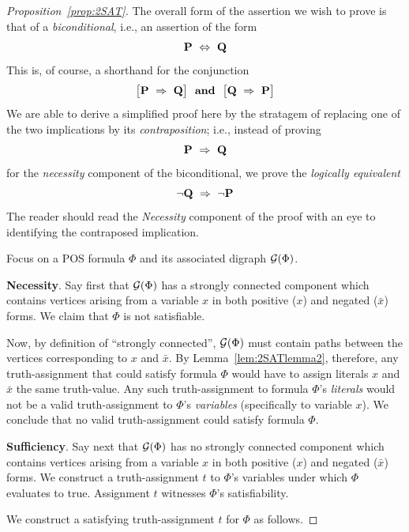 \begin{proof}[Proposition~\ref{prop:2SAT}]
The overall form of the assertion we wish to prove is that of a {\em biconditional},
i.e., an assertion of the form
\[ \mbox{\bf P} \ \Leftrightarrow \ \mbox{\bf Q} \]
This is, of course, a shorthand for the conjunction
\[  \big[ \mbox{\bf P} \ \Rightarrow \ \mbox{\bf Q} \big] \ \ 
\mbox{\bf and} \ \  
\big[ \mbox{\bf Q} \ \Rightarrow \ \mbox{\bf P} \big]
\]
We are able to derive a simplified proof here by the stratagem of replacing one of the
two implications by its {\em contraposition}; i.e., instead of proving
\[ \mbox{\bf P} \ \Rightarrow \ \mbox{\bf Q} \]
for the {\em necessity} component of the biconditional, we prove the {\em logically equivalent}
\[  \neg \mbox{\bf Q} \ \Rightarrow \ \neg \mbox{\bf P} \]
The reader should read the {\em Necessity} component of the proof with an eye to 
identifying the contraposed implication.

\medskip

Focus on a POS formula $\Phi$ and its associated digraph $\mbox{$\cal G$}(\Phi)$.

\smallskip

{\bf Necessity}.
Say first that $\mbox{$\cal G$}(\Phi)$ has a strongly connected component which
contains vertices arising from a variable $x$ in both positive ($x$)
and negated ($\bar{x}$) forms.  We claim that $\Phi$ is not
satisfiable.

Now, by definition of ``strongly connected'', $\mbox{$\cal G$}(\Phi)$ must contain
paths between the vertices corresponding to $x$ and $\bar{x}$.  By
Lemma~\ref{lem:2SATlemma2}, therefore, any truth-assignment that could
satisfy formula $\Phi$ would have to assign literals $x$ and $\bar{x}$
the same truth-value.  Any such truth-assignment to formula $\Phi$'s
{\em literals} would not be a valid truth-assignment to $\Phi$'s {\em
  variables} (specifically to variable $x$).  We conclude that no
valid truth-assignment could satisfy formula $\Phi$.

\medskip

{\bf Sufficiency}.
Say next that $\mbox{$\cal G$}(\Phi)$ has no strongly connected component which
contains vertices arising from a variable $x$ in both positive ($x$)
and negated ($\bar{x}$) forms.  We construct a truth-assignment $t$ to
$\Phi$'s variables under which $\Phi$ evaluates to {\sc true}.
Assignment $t$ witnesses $\Phi$'s satisfiability.

We construct a satisfying truth-assignment $t$ for $\Phi$ as follows.


\end{proof}
